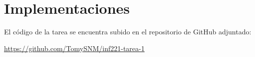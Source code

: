 \section{Implementaciones}
El código de la tarea se encuentra subido en el repositorio de GitHub adjuntado:

\url{https://github.com/TomySNM/inf221-tarea-1}